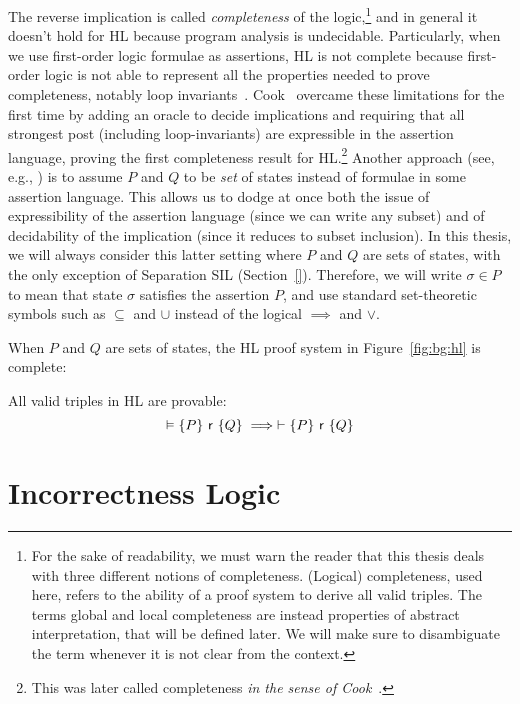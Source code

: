The reverse implication is called \emph{completeness} of the logic,\footnote{For the sake of readability, we must warn the reader that this thesis deals with three different notions of completeness. (Logical) completeness, used here, refers to the ability of a proof system to derive all valid triples. The terms global and local completeness are instead properties of abstract interpretation, that will be defined later. We will make sure to disambiguate the term whenever it is not clear from the context.} and in general it doesn't hold for HL because program analysis is undecidable. Particularly, when we use first-order logic formulae as assertions, HL is not complete because first-order logic is not able to represent all the properties needed to prove completeness, notably loop invariants~\cite[§2.7]{Apt81}.
Cook~\cite{Cook78} overcame these limitations for the first time by adding an oracle to decide implications and requiring that all strongest post (including loop-invariants) are expressible in the assertion language, proving the first completeness result for HL.\footnote{This was later called completeness \emph{in the sense of Cook}~\cite[§2.8]{Apt81}.}
Another approach (see, e.g., \cite{CCLB12,OHearn20}) is to assume $P$ and $Q$ to be \emph{set} of states instead of formulae in some assertion language. This allows us to dodge at once both the issue of expressibility of the assertion language (since we can write any subset) and of decidability of the implication (since it reduces to subset inclusion).
In this thesis, we will always consider this latter setting where $P$ and $Q$ are sets of states, with the only exception of Separation SIL (Section~\ref{}). Therefore, we will write $\sigma \in P$ to mean that state $\sigma$ satisfies the assertion $P$, and use standard set-theoretic symbols such as $\subseteq$ and $\cup$ instead of the logical $\implies$ and $\lor$.

When $P$ and $Q$ are sets of states, the HL proof system in Figure~\ref{fig:bg:hl} is complete:

\begin{theorem}
	All valid triples in HL are provable:
	\[
	\vDash \{P\}~\mathsf{r}~\{Q\} \implies \vdash \{P\}~\mathsf{r}~\{Q\}
	\]
\end{theorem}

\section{Incorrectness Logic}\label{sec:bg:il}

